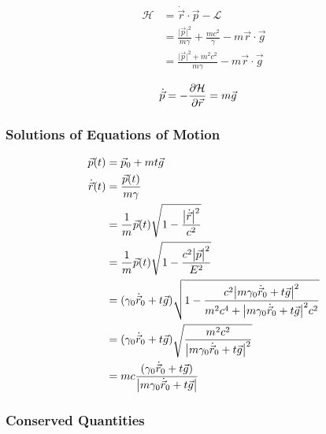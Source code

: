 \documentclass[12pt]{article}
\newcommand{\magsq}[1]{\big|#1\big|^2}
\newcommand{\Lag}{\mathcal{L}}
\newcommand{\Ham}{\mathcal{H}}
\newcommand{\pos}{\vec{r}}
\newcommand{\vel}{\dot{\vec{r}}}
\newcommand{\mom}{\vec{p}}
\begin{document}
\begin{align*}
    \Ham &= \vel\cdot\mom - \Lag \\
    &= \frac{\magsq{\mom}}{m\gamma} + \frac{mc^2}{\gamma} - m\pos\cdot\vec{g} \\
    &= \frac{\magsq{\mom} + m^2c^2}{m\gamma} - m\pos\cdot\vec{g}
\end{align*}

\begin{align*}
    \dot{\mom} &= -\pdv{\Ham}{\pos} = m\vec{g}
\end{align*}

\subsubsection*{Solutions of Equations of Motion}
\begin{align*}
    \mom(t) &= \mom_0 + mt\vec{g} \\
    \vel(t) &= \frac{\mom(t)}{m\gamma} \\
    &= \frac{1}{m}\mom(t)\sqrt{1 - \frac{\magsq{\vel}}{c^2}} \\
    &= \frac{1}{m}\mom(t)\sqrt{1 - \frac{c^2\magsq{\mom}}{E^2}} \\
    &= (\gamma_0\vel_0 + t\vec{g})\sqrt{1 - \frac{c^2\magsq{m\gamma_0\vel_0 + t\vec{g}}}{m^2c^4 + \magsq{m\gamma_0\vel_0 + t\vec{g}}c^2}} \\
    &= (\gamma_0\vel_0 + t\vec{g})\sqrt{\frac{m^2c^2}{\magsq{m\gamma_0\vel_0 + t\vec{g}}}} \\
    &= mc\frac{(\gamma_0\vel_0 + t\vec{g})}{\abs{m\gamma_0\vel_0 + t\vec{g}}}
\end{align*}


\subsubsection*{Conserved Quantities}
\end{document}
